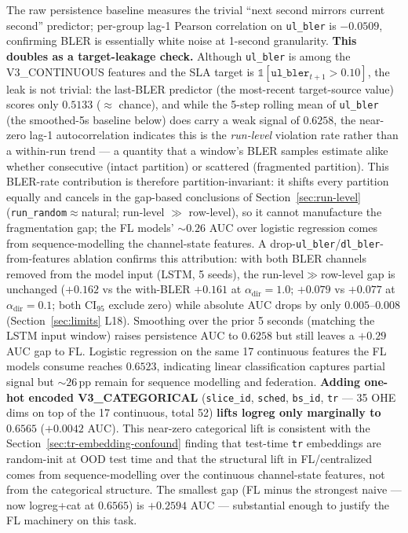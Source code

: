 \documentclass[journal]{IEEEtran}
\newcommand{\alphadir}{\ensuremath{\alpha_{\mathrm{dir}}}}
\begin{document}
The raw persistence baseline measures the trivial ``next second mirrors current second'' predictor; per-group lag-1 Pearson correlation on \lstinline|ul_bler| is $-0.0509$, confirming BLER is essentially white noise at 1-second granularity. \textbf{This doubles as a target-leakage check.} Although \lstinline|ul_bler| is among the V3\_CONTINUOUS features and the SLA target is $\mathbb{1}[\mathtt{ul\_bler}_{t+1} > 0.10]$, the leak is not trivial: the last-BLER predictor (the most-recent target-source value) scores only $0.5133$ ($\approx$ chance), and while the 5-step rolling mean of \lstinline|ul_bler| (the smoothed-5s baseline below) does carry a weak signal of $0.6258$, the near-zero lag-1 autocorrelation indicates this is the \emph{run-level} violation rate rather than a within-run trend --- a quantity that a window's BLER samples estimate alike whether consecutive (intact partition) or scattered (fragmented partition). This BLER-rate contribution is therefore partition-invariant: it shifts every partition equally and cancels in the gap-based conclusions of Section~\ref{sec:run-level} (\texttt{run\_random}$\approx$natural; run-level $\gg$ row-level), so it cannot manufacture the fragmentation gap; the FL models' $\sim 0.26$ AUC over logistic regression comes from sequence-modelling the channel-state features. A drop-\lstinline|ul_bler|/\lstinline|dl_bler|-from-features ablation confirms this attribution: with both BLER channels removed from the model input (LSTM, 5 seeds), the run-level$\gg$row-level gap is unchanged ($+0.162$ vs the with-BLER $+0.161$ at $\alphadir{=}1.0$; $+0.079$ vs $+0.077$ at $\alphadir{=}0.1$; both CI$_{95}$ exclude zero) while absolute AUC drops by only $0.005$--$0.008$ (Section~\ref{sec:limits} L18). Smoothing over the prior 5 seconds (matching the LSTM input window) raises persistence AUC to $0.6258$ but still leaves a $+0.29$ AUC gap to FL. Logistic regression on the same 17 continuous features the FL models consume reaches $0.6523$, indicating linear classification captures partial signal but $\sim 26$\,pp remain for sequence modelling and federation. \textbf{Adding one-hot encoded V3\_CATEGORICAL} (\lstinline|slice_id|, \lstinline|sched|, \lstinline|bs_id|, \lstinline|tr| --- 35 OHE dims on top of the 17 continuous, total 52) \textbf{lifts logreg only marginally to $0.6565$} ($+0.0042$ AUC). This near-zero categorical lift is consistent with the Section~\ref{sec:tr-embedding-confound} finding that test-time \lstinline|tr| embeddings are random-init at OOD test time and that the structural lift in FL/centralized comes from sequence-modelling over the continuous channel-state features, not from the categorical structure. The smallest gap (FL minus the strongest naive --- now logreg+cat at $0.6565$) is $+0.2594$ AUC --- substantial enough to justify the FL machinery on this task.
\end{document}
